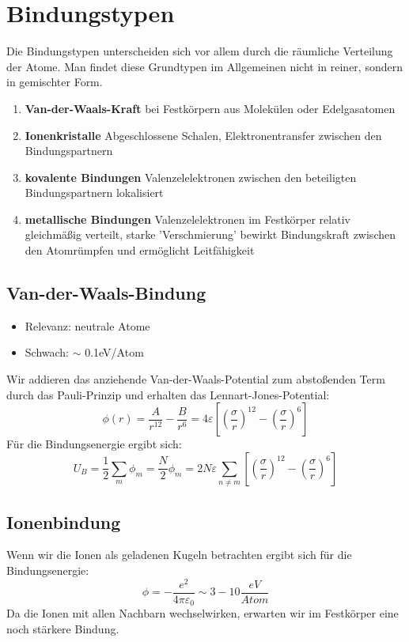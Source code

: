 \documentclass[11pt]{article}
\begin{document}
\section{Bindungstypen}
Die Bindungstypen unterscheiden sich vor allem durch die räumliche Verteilung
der Atome. Man findet diese Grundtypen im Allgemeinen nicht in reiner, sondern
in gemischter Form.
\begin{enumerate}
  \item \textbf{Van-der-Waals-Kraft} bei Festkörpern aus Molekülen oder
  Edelgasatomen
  \item \textbf{Ionenkristalle} Abgeschlossene Schalen, Elektronentransfer
  zwischen den Bindungspartnern
  \item \textbf{kovalente Bindungen} Valenzelelektronen zwischen den beteiligten
  Bindungspartnern lokalisiert
  \item \textbf{metallische Bindungen} Valenzelelektronen im Festkörper relativ
  gleichmäßig verteilt, starke 'Verschmierung' bewirkt Bindungskraft zwischen
  den Atomrümpfen und ermöglicht Leitfähigkeit
\end{enumerate}
\subsection{Van-der-Waals-Bindung}
\begin{itemize}
  \item Relevanz: neutrale Atome
  \item Schwach: $\sim$ 0.1eV/Atom
\end{itemize}
Wir addieren das anziehende Van-der-Waals-Potential zum abstoßenden Term durch
das Pauli-Prinzip und erhalten das Lennart-Jones-Potential:
\begin{equation}
  \phi (r) = \frac{A}{r^{12}} - \frac{B}{r^{6}} = 4 \varepsilon \left[ \left(
  \frac{\sigma}{r} \right )^{12} - \left ( \frac{\sigma}{r} \right )^6 \right ]
\end{equation}
Für die Bindungsenergie ergibt sich:
\begin{equation}
  U_B = \frac{1}{2} \sum_m \phi_m = \frac{N}{2} \phi_m = 2N\varepsilon \sum_{
  n \neq m} \left[ \left(
  \frac{\sigma}{r} \right )^{12} - \left ( \frac{\sigma}{r} \right )^6 \right ]
\end{equation}
\subsection{Ionenbindung}
Wenn wir die Ionen als geladenen Kugeln betrachten ergibt sich für die
Bindungsenergie:
\begin{equation}
  \phi = -\frac{e^2}{4\pi\varepsilon_0}\sim3-10\frac{eV}{Atom}
\end{equation}
Da die Ionen mit allen Nachbarn wechselwirken, erwarten wir im Festkörper
eine noch stärkere Bindung.
\end{document}
